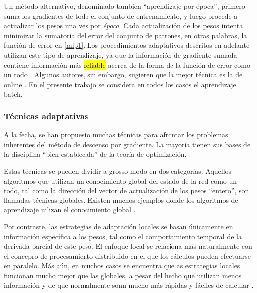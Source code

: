 \documentclass[12pt,bibliography=oldstyle,DIV=12,parskip=half-]{scrreprt}
\newcommand{\e}{\emph}
\begin{document}
Un método alternativo, denominado tambien ``aprendizaje por época'',
primero suma los gradientes de todo el conjunto de entrenamiento, y
luego procede a actualizar los pesos una vez por \e{época}.  Cada
actualización de los pesos intenta minimizar la sumatoria del error
del conjunto de patrones, en otras palabras, la función de error en
\autoref{mlp1}. Los procedimientos adaptativos descritos en adelante
utilizan este tipo de aprendizaje, ya que la información de gradiente
sumada contiene información más \hl{reliable} acerca de la forma de la
función de error como un todo \cite{reidmiller}.  Algunos autores, sin
embargo, sugieren que la mejor técnica es la de online \cite{haykin}.
En el presente trabajo se considera en todos los casos el aprendizaje
batch.
%
\subsubsection{Técnicas adaptativas}
%
A la fecha, se han propuesto muchas técnicas para afrontar los
problemas inherentes del método de descenso por gradiente. La mayoría
tienen sus bases de la disciplina ``bien establecida'' de la teoría de
optimización.

Estas técnicas se pueden dividir a grosso modo en dos
categorías. Aquellos algoritmos que utilizan un conocimiento global
del estado de la red como un todo, tal como la dirección del vector de
actualización de los pesos ``entero'', son llamadas técnicas globales.
Existen muchos ejemplos donde los algoritmos de aprendizaje uilizan el
conocimiento global \cite{salomon, moeller}.

Por contraste, las estrategias de adaptación locales se basan
únicamente en información específica a los pesos, tal como el
comportamiento temporal de la derivada parcial de este peso. El
enfoque local se relaciona más naturalmente con el concepro de
procesamiento distribuido en el que los cálculos pueden efectuarse en
paralelo.  Más aún, en muchos casos se encuentra que as estrategias
locales funcionan mucho mejor que las globales, a pesar del hecho que
utilizan menos información y de que normalmente sonn mucho más rápidas
y fáciles de calcular \cite{schiffmann}.
%
%

%
\end{document}
